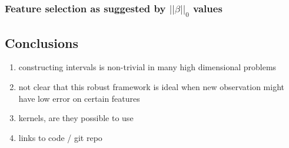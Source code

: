 \documentclass[11pt]{article}
\begin{document}
\subsubsection{Feature selection as suggested by $||\beta||_0$ values}



\subsection{Conclusions}
\begin{enumerate}
\item constructing intervals is non-trivial in many high dimensional problems
\item not clear that this robust framework is ideal when new observation might have low error on certain features
\item kernels, are they possible to use
\item links to code / git repo
\end{enumerate}



\end{document}

